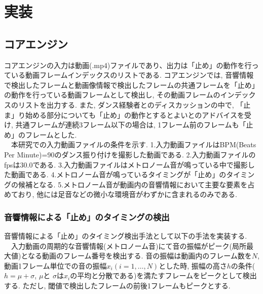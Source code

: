 \documentclass[paper]{ieicej}
\begin{document}
\section{実装}
\subsection{コアエンジン}
コアエンジンの入力は動画(.mp4)ファイルであり、出力は「止め」の動作を行っている動画フレームインデックスのリストである. コアエンジンでは, 音響情報で検出したフレームと動画像情報で検出したフレームの共通フレームを「止め」の動作を行っている動画フレームとして検出し, その動画フレームのインデックスのリストを出力する. また, ダンス経験者とのディスカッションの中で, 「止ま」り始める部分についても「止め」の動作とするとよいとのアドバイスを受け, 共通フレームが連続3フレーム以下の場合は, 1フレーム前のフレームも「止め」のフレームとした. \\
　本研究での入力動画ファイルの条件を示す. 1.入力動画ファイルはBPM(Beats Per Minute)=90のダンス振り付けを撮影した動画である. 2.入力動画ファイルのfpsは30.0である. 3.入力動画ファイルはメトロノーム音が鳴っている中で撮影した動画である. 4.メトロノーム音が鳴っているタイミングが「止め」のタイミングの候補となる. 5.メトロノーム音が動画内の音響情報において主要な要素を占めており, 他には足音などの微小な環境音がわずかに含まれるのみである. 
\subsubsection{音響情報による「止め」のタイミングの検出}
音響情報による「止め」のタイミング検出手法として以下の手法を実装する. \\
　入力動画の周期的な音響情報(メトロノーム音)にて音の振幅がピーク(局所最大値)となる動画のフレーム番号を検出する. 音の振幅は動画内のフレーム数を$N$, 動画1フレーム単位での音の振幅$x_i(i=1,\dots,N)$とした時, 振幅の高さ$h$の条件($h=\mu+\sigma$, $\mu$と $\sigma$は$x_i$の平均と分散である)を満たすフレームをピークとして検出する. ただし, 閾値で検出したフレームの前後1フレームもピークとする. 
\end{document}
